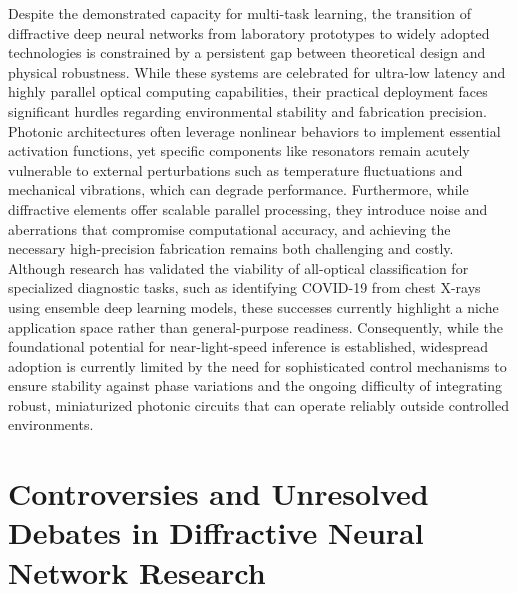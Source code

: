 \documentclass[11pt]{article}
\begin{document}
Despite the demonstrated capacity for multi-task learning, the transition of diffractive deep neural networks from laboratory prototypes to widely adopted technologies is constrained by a persistent gap between theoretical design and physical robustness. While these systems are celebrated for ultra-low latency and highly parallel optical computing capabilities, their practical deployment faces significant hurdles regarding environmental stability and fabrication precision. Photonic architectures often leverage nonlinear behaviors to implement essential activation functions, yet specific components like resonators remain acutely vulnerable to external perturbations such as temperature fluctuations and mechanical vibrations, which can degrade performance. Furthermore, while diffractive elements offer scalable parallel processing, they introduce noise and aberrations that compromise computational accuracy, and achieving the necessary high-precision fabrication remains both challenging and costly. Although research has validated the viability of all-optical classification for specialized diagnostic tasks, such as identifying COVID-19 from chest X-rays using ensemble deep learning models, these successes currently highlight a niche application space rather than general-purpose readiness. Consequently, while the foundational potential for near-light-speed inference is established, widespread adoption is currently limited by the need for sophisticated control mechanisms to ensure stability against phase variations and the ongoing difficulty of integrating robust, miniaturized photonic circuits that can operate reliably outside controlled environments. \citep{doi_10_3390_nano14080697_c372a140} \citep{doi_10_3390_app122010535_b538921c} \citep{doi_10_1364_josab_497148_b087424b}

\section{Controversies and Unresolved Debates in Diffractive Neural Network Research}\label{controversies-and-unresolved-debates-in-diffractive-neural-network-research}
\end{document}

